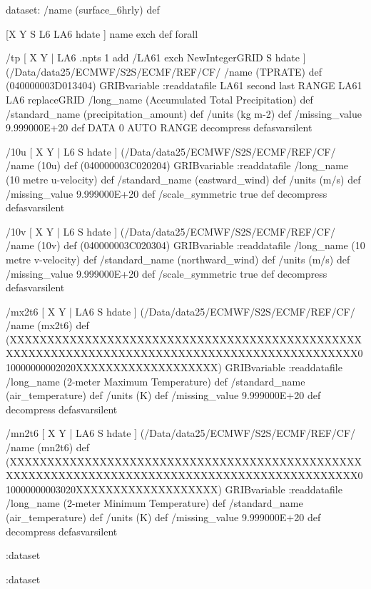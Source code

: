 \begin{ingrid}
dataset:
/name (surface_6hrly) def

 [X Y S L6 LA6 hdate ] {name exch def } forall

 /tp { [ X Y  | LA6 .npts 1 add /LA61 exch NewIntegerGRID S hdate ] (/Data/data25/ECMWF/S2S/ECMF/REF/CF/%
 /name (TPRATE) def
  (040000003D013404) GRIBvariable
 :readdatafile
 LA61 second last RANGE
 LA61 LA6 replaceGRID 
 /long_name (Accumulated Total Precipitation) def
 /standard_name (precipitation_amount) def
 /units (kg m-2) def
 /missing_value 9.999000E+20 def
 DATA 0 AUTO RANGE
 decompress
 } defasvarsilent


 /10u { [ X Y  | L6 S hdate ] (/Data/data25/ECMWF/S2S/ECMF/REF/CF/%
/name (10u) def
(040000003C020204) GRIBvariable
:readdatafile
/long_name (10 metre u-velocity) def
/standard_name (eastward_wind) def
/units (m/s) def
/missing_value 9.999000E+20 def
/scale_symmetric true def
decompress
} defasvarsilent

/10v { [ X Y  | L6 S hdate ] (/Data/data25/ECMWF/S2S/ECMF/REF/CF/%
/name (10v) def
(040000003C020304) GRIBvariable
:readdatafile
/long_name (10 metre v-velocity) def
/standard_name (northward_wind) def
/units (m/s) def
/missing_value 9.999000E+20 def
/scale_symmetric true def
decompress
} defasvarsilent


 /mx2t6 { [ X Y | LA6 S hdate ] (/Data/data25/ECMWF/S2S/ECMF/REF/CF/%
 /name (mx2t6) def
 (XXXXXXXXXXXXXXXXXXXXXXXXXXXXXXXXXXXXXXXXXXXXXXXXXXXXXXXXXXXXXXXXXXXXXXXXXXXXXXXXXXXXXXXXXXXXXX010000000002020XXXXXXXXXXXXXXXXXXX) GRIBvariable
:readdatafile
/long_name (2-meter Maximum Temperature) def
/standard_name (air_temperature) def
/units (K) def
/missing_value 9.999000E+20 def
decompress
 } defasvarsilent

 /mn2t6 { [ X Y  | LA6 S hdate ] (/Data/data25/ECMWF/S2S/ECMF/REF/CF/%
/name (mn2t6) def
(XXXXXXXXXXXXXXXXXXXXXXXXXXXXXXXXXXXXXXXXXXXXXXXXXXXXXXXXXXXXXXXXXXXXXXXXXXXXXXXXXXXXXXXXXXXXXX010000000003020XXXXXXXXXXXXXXXXXXX) GRIBvariable
:readdatafile
/long_name (2-meter Minimum Temperature) def
/standard_name (air_temperature) def
/units (K) def
/missing_value 9.999000E+20 def
decompress 
} defasvarsilent 


:dataset

:dataset

\end{ingrid}

